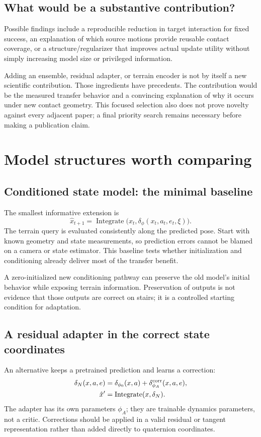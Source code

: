 \subsection{What would be a substantive contribution?}
Possible findings include a reproducible reduction in target interaction for
fixed success, an explanation of which source motions provide reusable contact
coverage, or a structure/regularizer that improves actual update utility without
simply increasing model size or privileged information.

Adding an ensemble, residual adapter, or terrain encoder is not by itself a
new scientific contribution. Those ingredients have precedents. The contribution
would be the measured transfer behavior and a convincing explanation of why it
occurs under new contact geometry. This focused selection also does not prove
novelty against every adjacent paper; a final priority search remains necessary
before making a publication claim.

\section{Model structures worth comparing}\label{sec:structures}
\subsection{Conditioned state model: the minimal baseline}
The smallest informative extension is
\begin{equation}
\hat x_{t+1}=\operatorname{Integrate}\big(x_t,
\delta_\phi(x_t,a_t,e_t,\xi)\big).
\end{equation}
The terrain query is evaluated consistently along the predicted pose. Start with
known geometry and state measurements, so prediction errors cannot be blamed
on a camera or state estimator. This baseline tests whether initialization and
conditioning already deliver most of the transfer benefit.

A zero-initialized new conditioning pathway can preserve the old model's initial
behavior while exposing terrain information. Preservation of outputs is not
evidence that those outputs are correct on stairs; it is a controlled starting
condition for adaptation.

\subsection{A residual adapter in the correct state coordinates}
An alternative keeps a pretrained prediction and learns a correction:
\begin{align}
\delta_N(x,a,e)&=\delta_{\phi_0}(x,a)+\delta_{\phi_A}^{\rm corr}(x,a,e),\\
\hat x'&=\operatorname{Integrate}(x,\delta_N).
\end{align}
The adapter has its own parameters $\phi_A$; they are trainable dynamics
parameters, not a critic. Corrections should be applied in a valid residual or
tangent representation rather than added directly to quaternion coordinates.

